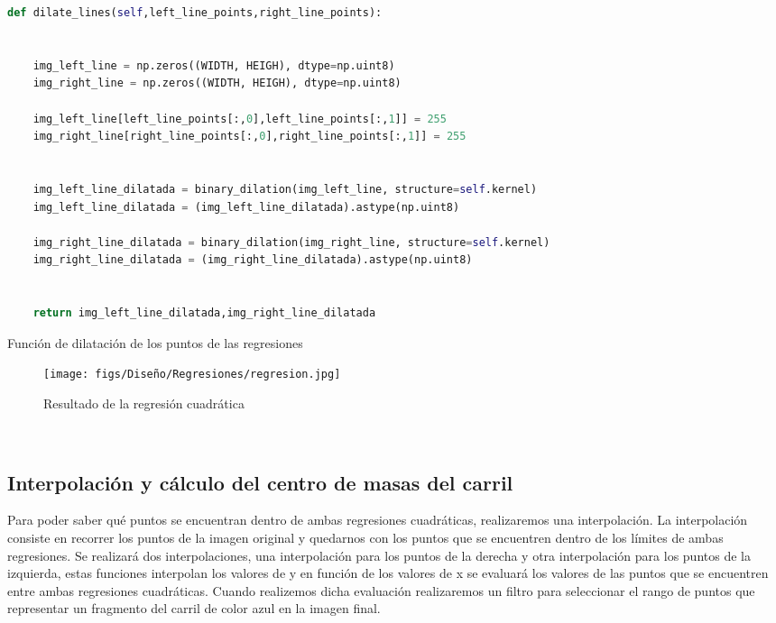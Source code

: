 \begin{code}[h]
  \begin{lstlisting}[language=Python]
    def dilate_lines(self,left_line_points,right_line_points):


    img_left_line = np.zeros((WIDTH, HEIGH), dtype=np.uint8)
    img_right_line = np.zeros((WIDTH, HEIGH), dtype=np.uint8)

    img_left_line[left_line_points[:,0],left_line_points[:,1]] = 255
    img_right_line[right_line_points[:,0],right_line_points[:,1]] = 255

    
    img_left_line_dilatada = binary_dilation(img_left_line, structure=self.kernel)
    img_left_line_dilatada = (img_left_line_dilatada).astype(np.uint8)

    img_right_line_dilatada = binary_dilation(img_right_line, structure=self.kernel)
    img_right_line_dilatada = (img_right_line_dilatada).astype(np.uint8)


    return img_left_line_dilatada,img_right_line_dilatada

  \end{lstlisting}
  \caption[Función de dilatación de los puntos de las regresiones]{Función de dilatación de los puntos de las regresiones}
  \label{cod:codejemplo}
  \end{code}  

\begin{figure} [H]
  \begin{center}
    \texttt{[image: figs/Diseño/Regresiones/regresion.jpg]}
  \end{center}
  \caption{Resultado de la regresión cuadrática}
  \label{fig:regresión cuadrática}
\end{figure}\

\subsection{Interpolación y cálculo del centro de masas del carril}
\label{sec:Interpolación y cálculo del centro de masas del carril}

Para poder saber qué puntos se encuentran dentro de ambas regresiones cuadráticas, realizaremos una interpolación. La interpolación consiste en recorrer
los puntos de la imagen original y quedarnos con los puntos que se encuentren dentro de los límites de ambas regresiones. Se realizará dos interpolaciones, una interpolación para los puntos de la derecha
y otra interpolación para los puntos de la izquierda, estas funciones interpolan los valores de y en función de los valores de x se evaluará los valores de las puntos que se encuentren entre 
ambas regresiones cuadráticas. Cuando realizemos dicha evaluación realizaremos un filtro para seleccionar el rango de puntos que representar un fragmento del carril de color azul en la imagen
final.\newline


